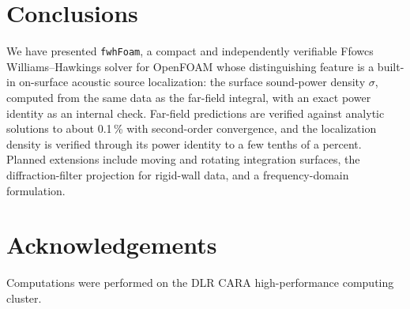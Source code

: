 \documentclass[preprint,12pt,a4paper]{elsarticle}
\begin{document}
\section{Conclusions}
\label{sec:conclusions}

We have presented \texttt{fwhFoam}, a compact and independently verifiable
Ffowcs Williams--Hawkings solver for OpenFOAM whose distinguishing feature is
a built-in on-surface acoustic source localization: the surface sound-power
density $\sigma$, computed from the same data as the far-field integral, with
an exact power identity as an internal check. Far-field predictions are
verified against analytic solutions to about 0.1\,\% with second-order
convergence, and the localization density is verified through its power
identity to a few tenths of a percent. Planned extensions include moving and
rotating integration surfaces, the diffraction-filter projection for
rigid-wall data, and a frequency-domain formulation.

\section*{Acknowledgements}

Computations were performed on the DLR CARA high-performance computing
cluster.
\end{document}
